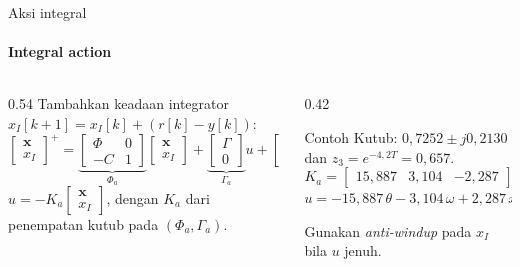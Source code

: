 \documentclass[aspectratio=169,10pt]{beamer}
\begin{document}
\begin{frame}{Aksi integral}
	\framesubtitle{Integral action}
	\begin{columns}[T]
		\begin{column}{0.54\textwidth}
			\small
			Tambahkan keadaan integrator $x_I[k+1] = x_I[k] + (r[k] - y[k])$:
			\[
				\begin{bmatrix}\mathbf{x}\\ x_I\end{bmatrix}^{\!+} =
				\underbrace{\begin{bmatrix}\Phi & 0\\ -C & 1\end{bmatrix}}_{\Phi_a}
				\begin{bmatrix}\mathbf{x}\\ x_I\end{bmatrix}
				+ \underbrace{\begin{bmatrix}\Gamma\\ 0\end{bmatrix}}_{\Gamma_a}u
				+ \begin{bmatrix}0\\ 1\end{bmatrix}r
			\]
			$u = -K_a\begin{bmatrix}\mathbf{x}\\ x_I\end{bmatrix}$, dengan $K_a$ dari penempatan kutub pada $(\Phi_a,\Gamma_a)$.
		\end{column}
		\begin{column}{0.42\textwidth}
			\begin{block}{Contoh}
				\small
				Kutub: $0{,}7252\pm j0{,}2130$ dan $z_3 = e^{-4{,}2T} = 0{,}657$.
				\[
					K_a = \begin{bmatrix}15{,}887 & 3{,}104 & -2{,}287\end{bmatrix}
				\]
				$u = -15{,}887\,\theta - 3{,}104\,\omega + 2{,}287\,x_I$
			\end{block}
			{\scriptsize Gunakan \textit{anti-windup} pada $x_I$ bila $u$ jenuh.}
		\end{column}
	\end{columns}
\end{frame}
\end{document}
